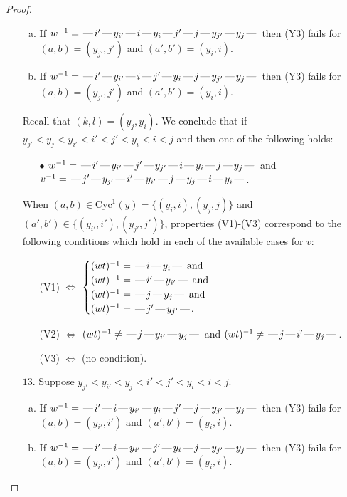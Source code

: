 \documentclass[10pt]{article}
\theoremstyle{definition}
\theoremstyle{definition}
\def\dash{\text{\hspace{0.5mm}---\hspace{0.5mm}}}
\def\Cyc{\mathrm{Cyc}}
\begin{document}
\begin{proof}
\begin{enumerate}
\begin{enumerate}[(a)]
\item If $w^{-1} = \dash i'\dash y_{i'}\dash i\dash y_i\dash j'\dash j\dash y_{j'}\dash y_j\dash $ then (Y3) fails for $(a,b)=(y_{j'},j')$ and $(a',b')=(y_i,i)$.
\item If $w^{-1} = \dash i'\dash y_{i'}\dash i\dash j'\dash y_i\dash j\dash y_{j'}\dash y_j\dash $ then (Y3) fails for $(a,b)=(y_{j'},j')$ and $(a',b')=(y_i,i)$.
\end{enumerate}
Recall that $(k,l) = (y_j,y_i)$.
We conclude that if $y_{j'} < y_j < y_{i'} < i' < j' < y_i < i < j$ and then one of the following holds:
\begin{enumerate}
\item[$\bullet$] $w^{-1} = \dash i'\dash y_{i'}\dash j'\dash y_{j'}\dash i\dash y_i\dash j\dash y_j\dash $ and $v^{-1} = \dash j'\dash y_{j'}\dash i'\dash y_{i'}\dash j\dash y_j\dash i\dash y_i\dash $.
\end{enumerate}
When $(a,b)\in\Cyc^1(y)=\{(y_i,i),(y_j,j)\}$ and $(a',b')\in\{(y_{i'},i'),(y_{j'},j')\}$,
properties (V1)-(V3) correspond to the following conditions which hold in
each of the available cases for $v$:
\begin{enumerate}
\item[](V1) $\Leftrightarrow$ $\begin{cases}\text{$(wt)^{-1} = \dash i \dash y_i \dash$}\text{ and }\\
\text{$(wt)^{-1} = \dash i' \dash y_{i'} \dash$}\text{ and }\\
\text{$(wt)^{-1} = \dash j \dash y_j \dash$}\text{ and }\\
\text{$(wt)^{-1} = \dash j' \dash y_{j'} \dash$}.\end{cases}$
\item[](V2) $\Leftrightarrow$ $(wt)^{-1} \neq \dash j \dash y_{i'} \dash y_j \dash$ and $(wt)^{-1}\neq \dash j \dash i' \dash y_j \dash$.
\item[](V3) $\Leftrightarrow$ (no condition).
\end{enumerate}
\item[$13$.] Suppose $y_{j'} < y_{i'} < y_j < i' < j' < y_i < i < j$.
\begin{enumerate}[(a)]
\item If $w^{-1} = \dash i'\dash i\dash y_{i'}\dash y_i\dash j'\dash j\dash y_{j'}\dash y_j\dash $ then (Y3) fails for $(a,b)=(y_{i'},i')$ and $(a',b')=(y_i,i)$.
\item If $w^{-1} = \dash i'\dash i\dash y_{i'}\dash j'\dash y_i\dash j\dash y_{j'}\dash y_j\dash $ then (Y3) fails for $(a,b)=(y_{i'},i')$ and $(a',b')=(y_i,i)$.

\end{enumerate}
\end{enumerate}
\end{proof}
\end{document}
